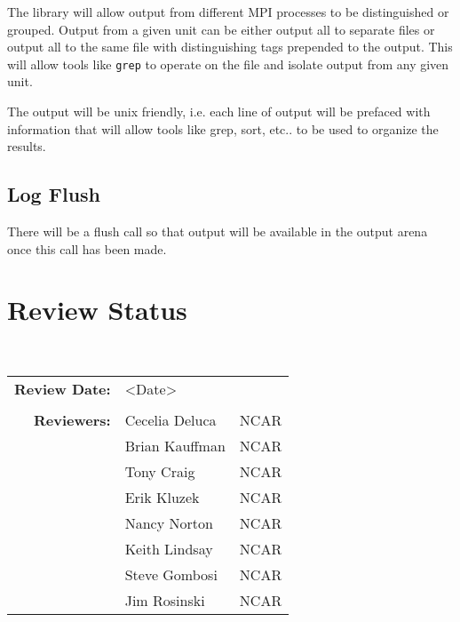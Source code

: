 \documentclass[]{article}
\begin{document}
The library will allow output from different MPI processes to be distinguished
or grouped.  Output from a given unit 
can be either output all to separate files or output all to the same
file with distinguishing tags prepended to the output.  This will allow tools
like {\tt grep} to operate on the file and isolate output from any given unit.

The output will be unix friendly, i.e. each line of output will be prefaced
with information that will allow tools like grep, sort, etc.. to be used to
organize the results.

\subsection{Log Flush}

There will be a flush call so that output will be available in the output arena
once this call has been made.
\section{Review Status}

 \\

\begin{tabular}{r p{1.3in} p{2in}}
{\bf Review Date:} & <Date> \\ \\
{\bf Reviewers:}   & Cecelia Deluca     & NCAR \\
                   & Brian Kauffman     & NCAR \\
                   & Tony Craig         & NCAR \\
                   & Erik Kluzek        & NCAR \\
                   & Nancy Norton       & NCAR \\
                   & Keith Lindsay      & NCAR \\
                   & Steve Gombosi      & NCAR \\
                   & Jim Rosinski       & NCAR
\end{tabular}
%

 

\end{document}
